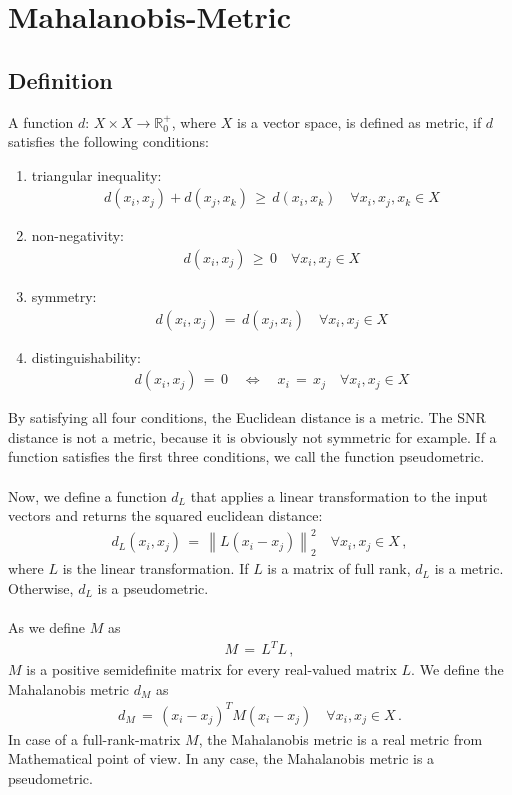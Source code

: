 \documentclass[12pt,paper=a4]{scrartcl}
\theoremstyle{break}
\newcommand{\norm}[1]{\left\lVert#1\right\rVert}
\begin{document}
\section{Mahalanobis-Metric}
\subsection{Definition}
A function $d:\, X\times X\rightarrow \mathbb{R}_0^+$, where $X$ is a vector space, is defined as metric, if $d$ satisfies the following conditions:
\begin{enumerate}
\item triangular inequality:
\begin{align}
d(x_i,x_j)+d(x_j,x_k)\, \geq\, d(x_i,x_k)\quad \forall x_i, x_j, x_k \in X
\end{align}
\item non-negativity:
\begin{align}
d(x_i,x_j)\,\geq\, 0\quad \forall x_i,x_j\in X
\end{align}
\item symmetry:
\begin{align}
d(x_i,x_j)\, =\, d(x_j,x_i)\quad \forall x_i, x_j\in X
\end{align}
\item distinguishability:
\begin{align}
d(x_i,x_j)\, = \, 0\quad \Leftrightarrow\quad x_i\, = \, x_j \quad\forall x_i,x_j\in X
\end{align}
\end{enumerate}
By satisfying all four conditions, the Euclidean distance is a metric. The SNR distance is not a metric, because it is obviously not symmetric for example. If a function satisfies the first three conditions, we call the function pseudometric. \\ \\
Now, we define a function $d_L$ that applies a linear transformation to the input vectors and returns the squared euclidean distance:
\begin{align}
d_L(x_i, x_j)\,=\,\norm{L(x_i-x_j)}_2^2\quad \forall x_i,x_j\in X\, ,
\end{align}
where $L$ is the linear transformation. If $L$ is a matrix of full rank, $d_L$ is a metric. Otherwise, $d_L$ is a pseudometric. \\ \\
As we define $M$ as
\begin{align}
M \, = \, L^T L\, ,
\end{align}
$M$ is a positive semidefinite matrix for every real-valued matrix $L$. We define the Mahalanobis metric $d_M$ as
\begin{align}
d_M\, =\, (x_i - x_j)^T M (x_i-x_j)\quad \forall x_i,x_j\in X\, .
\end{align}
In case of a full-rank-matrix $M$, the Mahalanobis metric is a real metric from Mathematical point of view. In any case, the Mahalanobis metric is a pseudometric.\cite{mahalanobis}
\end{document}
